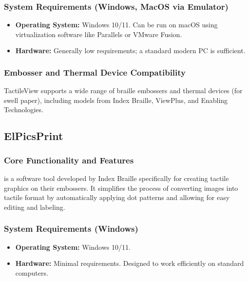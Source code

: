 \subsubsection{System Requirements (Windows, MacOS via Emulator)}\label{ch14:sssec:tactileview-sysreq}
\begin{itemize}
	\item \textbf{Operating System:} Windows 10/11. Can be run on macOS using virtualization software like Parallels or VMware Fusion.
	\item \textbf{Hardware:} Generally low requirements; a standard modern PC is sufficient.
\end{itemize}

\subsubsection{Embosser and Thermal Device Compatibility}\label{ch14:sssec:tactileview-compat}
TactileView supports a wide range of braille embossers and thermal devices (for swell paper), including models from Index Braille, ViewPlus, and Enabling Technologies\supercite{IrieTactileView}.

\subsection{ElPicsPrint}\label{ch14:ssec:elpicsprint}
\subsubsection{Core Functionality and Features}\label{ch14:sssec:elpicsprint-features}
 is a software tool developed by Index Braille\supercite{ElitaElPicsPrint} specifically for creating tactile graphics on their embossers. It simplifies the process of converting images into tactile format by automatically applying dot patterns and allowing for easy editing and labeling\supercite{ElitaManual}.

\subsubsection{System Requirements (Windows)}\label{ch14:sssec:elpicsprint-sysreq}
\begin{itemize}
	\item \textbf{Operating System:} Windows 10/11.
	\item \textbf{Hardware:} Minimal requirements. Designed to work efficiently on standard computers.
\end{itemize}

